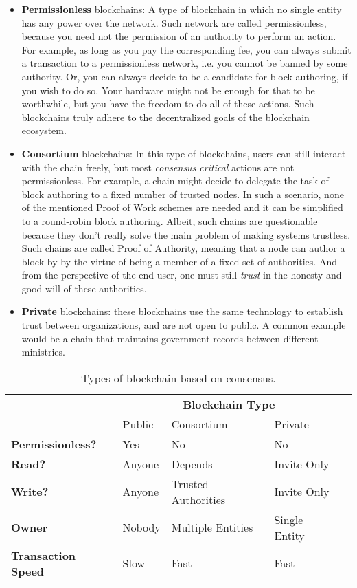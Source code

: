 \begin{itemize}
	\item \textbf{Permissionless} blockchains: A type of blockchain in which no single entity has
	any power over the network. Such network are called permissionless, because you need not the
	permission of an authority to perform an action. For example, as long as you pay the
	corresponding fee, you can always submit a transaction to a permissionless network, i.e. you
	cannot be banned by some authority. Or, you can always decide to be a candidate for block
	authoring, if you wish to do so. Your hardware might not be enough for that to be worthwhile,
	but you have the freedom to do all of these actions. Such blockchains truly adhere to the
	decentralized goals of the blockchain ecosystem.
	\item \textbf{Consortium} blockchains: In this type of blockchains, users can still interact
	with the chain freely, but most \textit{consensus critical} actions are not permissionless. For
	example, a chain might decide to delegate the task of block authoring to a fixed number of
	trusted nodes. In such a scenario, none of the mentioned Proof of Work schemes are needed and it
	can be simplified to a round-robin block authoring. Albeit, such chains are questionable because
	they don't really solve the main problem of making systems trustless. Such chains are called
	Proof of Authority, meaning that a node can author a block by by the virtue of being a member of
	a fixed set of authorities. And from the perspective of the end-user, one must still
	\textit{trust} in the honesty and good will of these authorities.
	\item \textbf{Private} blockchains: these blockchains use the same technology to establish trust
	between organizations, and are not open to public. A common example would be a chain that
	maintains government records between different ministries.
\end{itemize}

\begin{table}[]
	\caption{Types of blockchain based on consensus.}
	\label{table:blockchain_types}
	\begin{tabular}{lllll}
													& \multicolumn{3}{c}{\textbf{Blockchain Type}} &  \\
													& Public & Consortium          & Private       &  \\ \cline{1-4}
	\multicolumn{1}{l|}{\textbf{Permissionless?}}   & Yes    & No                  & No            &  \\
	\multicolumn{1}{l|}{\textbf{Read?}}             & Anyone & Depends             & Invite Only   &  \\
	\multicolumn{1}{l|}{\textbf{Write?}}            & Anyone & Trusted Authorities & Invite Only   &  \\
	\multicolumn{1}{l|}{\textbf{Owner}}             & Nobody & Multiple Entities   & Single Entity &  \\
	\multicolumn{1}{l|}{\textbf{Transaction Speed}} & Slow   & Fast                & Fast          &
	\end{tabular}
\end{table}


